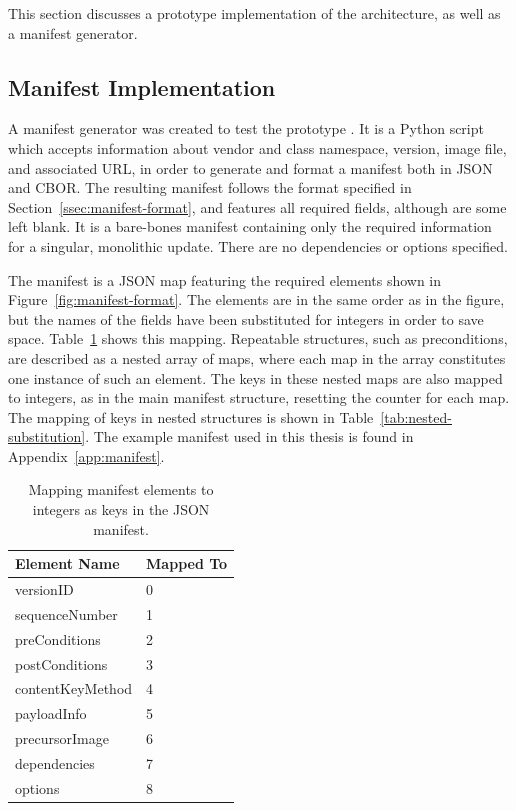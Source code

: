 \documentclass[0-thesis.tex]{subfiles}
\begin{document}
This section discusses a prototype implementation of the architecture, as well as a
manifest generator. 

\subsection{Manifest Implementation}
\label{ssec:manifest-implementation}
A manifest generator was created to test the prototype \parencite{manifest-generator}. It
is a Python script which accepts information about vendor and class namespace, version,
image file, and associated URL, in order to generate and format a manifest both in JSON
and CBOR. The resulting manifest follows the format specified in
Section~\ref{ssec:manifest-format}, and features all required fields, although are some
left blank. It is a bare-bones manifest containing only the required information for a
singular, monolithic update. There are no dependencies or options specified.

The manifest is a JSON map featuring the required elements shown in
Figure~\ref{fig:manifest-format}. The elements are in the same order as in the figure, but
the names of the fields have been substituted for integers in order to save space.
Table~\ref{tab:manifest-substitution} shows this mapping. Repeatable structures, such as
preconditions, are described as a nested array of maps, where each map in the array
constitutes one instance of such an element. The keys in these nested maps are also mapped
to integers, as in the main manifest structure, resetting the counter for each map. The
mapping of keys in nested structures is shown in Table~\ref{tab:nested-substitution}. The
example manifest used in this thesis is found in Appendix~\ref{app:manifest}. 

\newpage
\begin{longtable}[]{@{}ll@{}}
    \caption{Mapping manifest elements to integers as keys in the JSON manifest.}
    \label{tab:manifest-substitution}\\
    \toprule
    Element Name & Mapped To\tabularnewline
    \midrule
    \endhead
    versionID & 0\tabularnewline
    sequenceNumber & 1\tabularnewline
    preConditions & 2\tabularnewline
    postConditions & 3\tabularnewline
    contentKeyMethod & 4\tabularnewline
    payloadInfo & 5\tabularnewline
    precursorImage & 6\tabularnewline
    dependencies & 7\tabularnewline
    options & 8\tabularnewline
    \bottomrule
\end{longtable}
\end{document}
